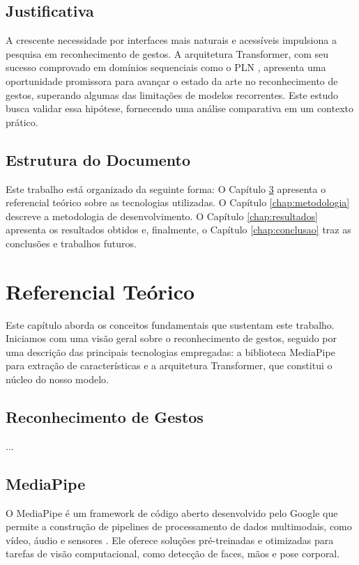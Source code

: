 \documentclass[
	a4paper,      %
	12pt,         %
	english,      %
	oneside,      %
	openany       %
]{abntex2}
\begin{document}
\section{Justificativa}

A crescente necessidade por interfaces mais naturais e acessíveis impulsiona a pesquisa em reconhecimento de gestos. A arquitetura Transformer, com seu sucesso comprovado em domínios sequenciais como o PLN \cite{devlin2018bert}, apresenta uma oportunidade promissora para avançar o estado da arte no reconhecimento de gestos, superando algumas das limitações de modelos recorrentes. Este estudo busca validar essa hipótese, fornecendo uma análise comparativa em um contexto prático.

\section{Estrutura do Documento}

Este trabalho está organizado da seguinte forma: O Capítulo \ref{chap:referencial} apresenta o referencial teórico sobre as tecnologias utilizadas. O Capítulo \ref{chap:metodologia} descreve a metodologia de desenvolvimento. O Capítulo \ref{chap:resultados} apresenta os resultados obtidos e, finalmente, o Capítulo \ref{chap:conclusao} traz as conclusões e trabalhos futuros.

\chapter{Referencial Teórico}
\label{chap:referencial}

Este capítulo aborda os conceitos fundamentais que sustentam este trabalho. Iniciamos com uma visão geral sobre o reconhecimento de gestos, seguido por uma descrição das principais tecnologias empregadas: a biblioteca MediaPipe para extração de características e a arquitetura Transformer, que constitui o núcleo do nosso modelo.

\section{Reconhecimento de Gestos}
...

\section{MediaPipe}
O MediaPipe é um framework de código aberto desenvolvido pelo Google que permite a construção de pipelines de processamento de dados multimodais, como vídeo, áudio e sensores \cite{lugaresi2019mediapipe}. Ele oferece soluções pré-treinadas e otimizadas para tarefas de visão computacional, como detecção de faces, mãos e pose corporal.
\end{document}
